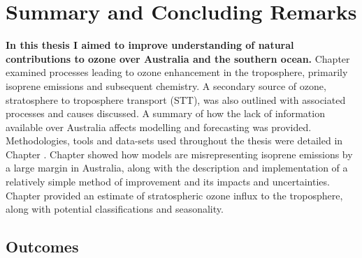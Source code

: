 \chapter{Summary and Concluding Remarks} %
\label{Conclusions}

  \textbf{In this thesis I aimed to improve understanding of natural contributions to ozone over Australia and the southern ocean.}
  Chapter  examined processes leading to ozone enhancement in the troposphere, primarily isoprene emissions and subsequent chemistry.
  A secondary source of ozone, stratosphere to troposphere transport (STT), was also outlined with associated processes and causes discussed.
  A summary of how the lack of information available over Australia affects modelling and forecasting was provided.
  Methodologies, tools and data-sets used throughout the thesis were detailed in Chapter .
  Chapter  showed how models are misrepresenting isoprene emissions by a large margin in Australia, along with the description and implementation of a relatively simple method of improvement and its impacts and uncertainties.
  Chapter  provided an estimate of stratospheric ozone influx to the troposphere, along with potential classifications and seasonality.

\section{Outcomes}
\label{Conclusions:aims}
  
